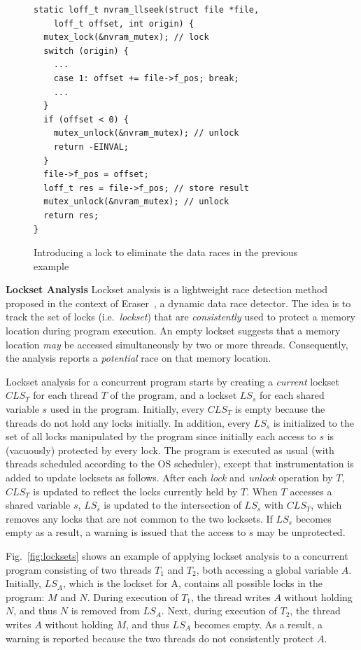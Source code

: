 \begin{figure}[t]
\begin{lstlisting}
static loff_t nvram_llseek(struct file *file,
    loff_t offset, int origin) {
  mutex_lock(&nvram_mutex); // lock
  switch (origin) {
    ...
    case 1: offset += file->f_pos; break;
    ...
  }
  if (offset < 0) {
    mutex_unlock(&nvram_mutex); // unlock
    return -EINVAL;
  }
  file->f_pos = offset;
  loff_t res = file->f_pos; // store result
  mutex_unlock(&nvram_mutex); // unlock
  return res;
}
\end{lstlisting}
\caption{Introducing a lock to eliminate the data races in the previous example}
\label{fig:lock_example}
\end{figure}

\noindent\textbf{Lockset Analysis }
%
Lockset analysis is a lightweight race detection method proposed in the context of Eraser~\cite{savage1997eraser}, a dynamic data race detector.  The idea is to track the set of locks (i.e.\ \emph{lockset}) that are \emph{consistently} used to protect a memory location during program execution. An empty lockset suggests that a memory location \emph{may} be accessed simultaneously by two or more threads. Consequently, the analysis reports a \emph{potential} race on that memory location.

Lockset analysis for a concurrent program starts by creating a \emph{current} lockset $\mathit{CLS}_T$ for each thread $T$ of the program, and a lockset $\mathit{LS}_s$ for each shared variable $s$ used in the program. Initially, every $\mathit{CLS}_T$ is empty because the threads do not hold any locks initially. In addition, every $\mathit{LS}_s$ is initialized to the set of all locks manipulated by the program since initially each access to $s$ is (vacuously) protected by every lock. The program is executed as usual (with threads scheduled according to the OS scheduler), except that instrumentation is added to update locksets as follows.
%
After each \emph{lock} and \emph{unlock} operation by $T$, $\mathit{CLS}_T$ is updated to reflect the locks currently held by $T$.
%
When $T$ accesses a shared variable $s$, $\mathit{LS}_s$ is updated to the intersection of $\mathit{LS}_s$ with $\mathit{CLS}_T$, which removes any locks that are not common to the two locksets.
%
If $\mathit{LS}_s$ becomes empty as a result, a warning is issued that the access to $s$ may be unprotected.

Fig.~\ref{fig:locksets} shows an example of applying lockset analysis to a concurrent program consisting of two threads $T_1$ and $T_2$, both accessing a global variable $A$. Initially, $\mathit{LS}_A$, which is the lockset for A, contains all possible locks in the program: $M$ and $N$. During execution of $T_1$, the thread writes $A$ without holding $N$, and thus $N$ is removed from $\mathit{LS}_A$. Next, during execution of $T_2$, the thread writes $A$ without holding $M$, and thus $\mathit{LS}_A$ becomes empty. As a result, a warning is reported because the two threads do not consistently protect $A$.

